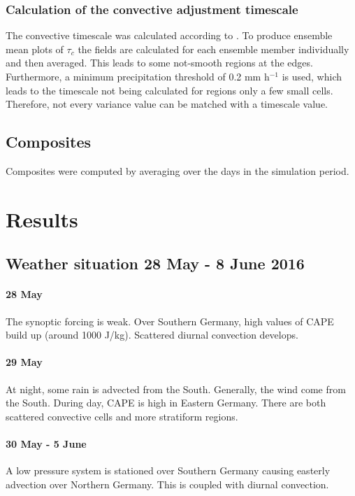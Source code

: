\documentclass[a4paper, 12pt]{article}
\begin{document}
\subsubsection{Calculation of the convective adjustment timescale}
The convective timescale was calculated according to \cite{Flack2016}. To produce ensemble mean plots of $\tau_c$ the fields are calculated for each ensemble member individually and then averaged. This leads to some not-smooth regions at the edges. Furthermore, a minimum precipitation threshold of 0.2 mm h$^{-1}$ is used, which leads to the timescale not being calculated for regions only a few small cells. Therefore, not every variance value can be matched with a timescale value. 

\subsection{Composites}
Composites were computed by averaging over the days in the simulation period. 

\section{Results}

\subsection{Weather situation 28 May - 8 June 2016}
\paragraph{28 May} The synoptic forcing is weak. Over Southern Germany, high values of CAPE build up (around 1000 J/kg). Scattered diurnal convection develops.

\paragraph{29 May} At night, some rain is advected from the South. Generally, the wind come from the South. During day, CAPE is high in Eastern Germany. There are both scattered convective cells and more stratiform regions.

\paragraph{30 May - 5 June} A low pressure system is stationed over Southern Germany causing easterly advection over Northern Germany. This is coupled with diurnal convection.
\end{document}
